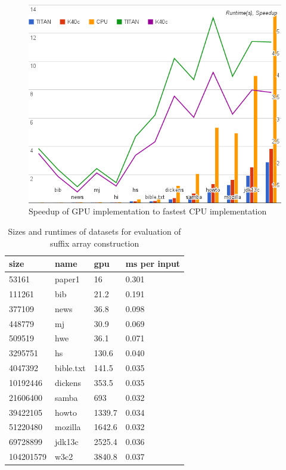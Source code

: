 \begin{figure}[ht!]
\centering
\includegraphics[width=1.0\textwidth]{images/saresult.png}
\caption{Speedup of GPU implementation to fastest CPU implementation}
\label{fig:saresult}
\end{figure}

\begin{table}[h]
\centering
\begin{tabular}{@{}llll@{}}
\toprule
size      & name      & gpu    & ms per input \\ \midrule
53161     & paper1    & 16     & 0.301        \\
111261    & bib       & 21.2   & 0.191        \\
377109    & news      & 36.8   & 0.098        \\
448779    & mj        & 30.9   & 0.069        \\
509519    & hwe        & 36.1   & 0.071        \\
3295751   & hs        & 130.6  & 0.040        \\
4047392   & bible.txt & 141.5  & 0.035        \\
10192446  & dickens   & 353.5  & 0.035        \\
21606400  & samba     & 693    & 0.032        \\
39422105  & howto     & 1339.7 & 0.034        \\
51220480  & mozilla   & 1642.6 & 0.032        \\
69728899  & jdk13c    & 2525.4 & 0.036        \\
104201579 & w3c2      & 3840.8 & 0.037        \\ \bottomrule
\end{tabular}
\caption{Sizes and runtimes of datasets for evaluation of suffix array construction}
\label{tab:sadata}
\end{table}

